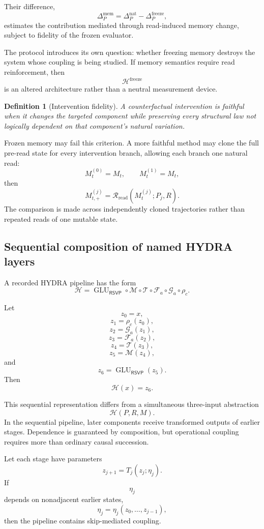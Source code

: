 \documentclass[11pt]{article}
\newtheorem{definition}{Definition}[section]
\theoremstyle{definition}
\newcommand{\Hh}{\mathcal{H}}
\newcommand{\RSVP}{\mathsf{RSVP}}
\begin{document}
Their difference,
\[
\Delta_P^{\mathrm{mem}}
=
\Delta_P^{\mathrm{nat}}
-
\Delta_P^{\mathrm{freeze}},
\]
estimates the contribution mediated through read-induced memory change, subject to fidelity of the frozen evaluator.

The protocol introduces its own question: whether freezing memory destroys the system whose coupling is being studied. If memory semantics require read reinforcement, then
\[
\Hh^{\mathrm{freeze}}
\]
is an altered architecture rather than a neutral measurement device.

\begin{definition}[Intervention fidelity]
A counterfactual intervention is faithful when it changes the targeted component while preserving every structural law not logically dependent on that component's natural variation.
\end{definition}

Frozen memory may fail this criterion. A more faithful method may clone the full pre-read state for every intervention branch, allowing each branch one natural read:
\[
M_t^{(0)}=M_t,
\qquad
M_t^{(1)}=M_t,
\]
then
\[
M_{t,+}^{(j)}
=
\mathcal R_{\mathrm{read}}
\left(
M_t^{(j)};P_j,R
\right).
\]
The comparison is made across independently cloned trajectories rather than repeated reads of one mutable state.

\subsection{Sequential composition of named HYDRA layers}

A recorded HYDRA pipeline has the form
\[
\Hh
=
\operatorname{GLU}_{\RSVP}
\circ
\mathcal M
\circ
\mathcal T
\circ
\mathcal F_a
\circ
\mathcal G_a
\circ
\rho_c.
\]

Let
\[
z_0=x,
\]
\[
z_1=\rho_c(z_0),
\]
\[
z_2=\mathcal G_a(z_1),
\]
\[
z_3=\mathcal F_a(z_2),
\]
\[
z_4=\mathcal T(z_3),
\]
\[
z_5=\mathcal M(z_4),
\]
and
\[
z_6
=
\operatorname{GLU}_{\RSVP}(z_5).
\]
Then
\[
\Hh(x)=z_6.
\]

This sequential representation differs from a simultaneous three-input abstraction
\[
\Hh(P,R,M).
\]
In the sequential pipeline, later components receive transformed outputs of earlier stages. Dependence is guaranteed by composition, but operational coupling requires more than ordinary causal succession.

Let each stage have parameters
\[
z_{j+1}
=
T_j(z_j;\eta_j).
\]
If
\[
\eta_j
\]
depends on nonadjacent earlier states,
\[
\eta_j
=
\eta_j(z_0,\ldots,z_{j-1}),
\]
then the pipeline contains skip-mediated coupling.
\end{document}

